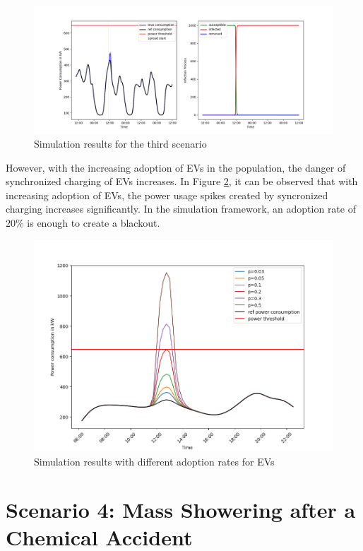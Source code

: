 \begin{figure}[!ht]
    \center
    \includegraphics[scale=.5]{figs/eval/scenario3/scenario3basic.png}
    \caption{Simulation results for the third scenario}
    \label{thirdscenarioresults}
\end{figure}

However, with the increasing adoption of EVs in the 
population, the danger of synchronized charging 
of EVs increases. In Figure \ref{thirdscenarioresultsdiffadoption},
it can be observed that with increasing adoption of EVs,
the power usage spikes created by syncronized charging 
increases significantly. In the simulation framework,
an adoption rate of $20\%$ is enough to create a 
blackout.

\begin{figure}[!ht]
    \center
    \includegraphics[scale=.5]{figs/eval/scenario3/changingadoption.png}
    \caption{Simulation results with different adoption rates for EVs}
    \label{thirdscenarioresultsdiffadoption}
\end{figure}

\section{Scenario 4: Mass Showering after a Chemical Accident}
\label{scenario4total}

